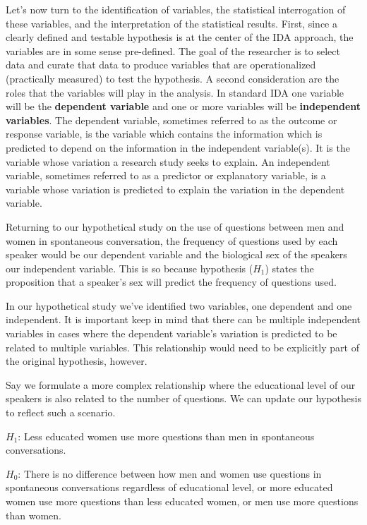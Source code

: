 \documentclass[
  letterpaper,
]{latex/krantz}
\begin{document}
Let's now turn to the identification of variables, the statistical
interrogation of these variables, and the interpretation of the
statistical results. First, since a clearly defined and testable
hypothesis is at the center of the IDA approach, the variables are in
some sense pre-defined. The goal of the researcher is to select data and
curate that data to produce variables that are operationalized
(practically measured) to test the hypothesis. A second consideration
are the roles that the variables will play in the analysis. In standard
IDA one variable will be the \textbf{dependent variable} and one or more
variables will be \textbf{independent variables}. The dependent
variable, sometimes referred to as the outcome or response variable, is
the variable which contains the information which is predicted to depend
on the information in the independent variable(s). It is the variable
whose variation a research study seeks to explain. An independent
variable, sometimes referred to as a predictor or explanatory variable,
is a variable whose variation is predicted to explain the variation in
the dependent variable.

Returning to our hypothetical study on the use of questions between men
and women in spontaneous conversation, the frequency of questions used
by each speaker would be our dependent variable and the biological sex
of the speakers our independent variable. This is so because hypothesis
(\(H_1\)) states the proposition that a speaker's sex will predict the
frequency of questions used.

In our hypothetical study we've identified two variables, one dependent
and one independent. It is important keep in mind that there can be
multiple independent variables in cases where the dependent variable's
variation is predicted to be related to multiple variables. This
relationship would need to be explicitly part of the original
hypothesis, however.

Say we formulate a more complex relationship where the educational level
of our speakers is also related to the number of questions. We can
update our hypothesis to reflect such a scenario.

\(H_1\): Less educated women use more questions than men in spontaneous
conversations.

\(H_0\): There is no difference between how men and women use questions
in spontaneous conversations regardless of educational level, or more
educated women use more questions than less educated women, or men use
more questions than women.
\end{document}
